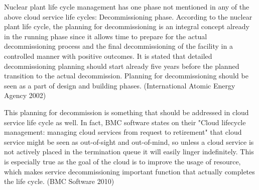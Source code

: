 \documentclass{article}
\begin{document}
\par
Nuclear plant life cycle management has one phase not mentioned in any of the above cloud service life cycles: Decommissioning phase. According to the nuclear plant life cycle, the planning for decommissioning is an integral concept already in the running phase since it allows time to prepare for the actual decommissioning process and the final decommissioning of the facility in a controlled manner with positive outcomes. It is stated that detailed decommissioning planning should start already five years before the planned transition to the actual decommission. Planning for decommissioning should be seen as a part of design and building phases. (International Atomic Energy Agency 2002)
\par
This planning for decommission is something that should be addressed in cloud service life cycle as well. In fact, BMC software states on their "Cloud lifecycle management: managing cloud services from request to retirement" that cloud service might be seen as out-of-sight and out-of-mind, so unless a cloud service is not actively placed in the termination queue it will easily linger indefinitely. This is especially true as the goal of the cloud is to improve the usage of resource, which makes service decommissioning important function that actually completes the life cycle. (BMC Software 2010)
\end{document}
